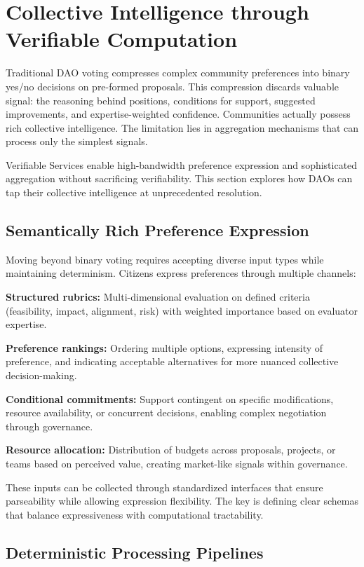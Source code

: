 \section{Collective Intelligence through Verifiable Computation}

Traditional DAO voting compresses complex community preferences into binary yes/no decisions on pre-formed proposals. This compression discards valuable signal: the reasoning behind positions, conditions for support, suggested improvements, and expertise-weighted confidence. Communities actually possess rich collective intelligence. The limitation lies in aggregation mechanisms that can process only the simplest signals.

Verifiable Services enable high-bandwidth preference expression and sophisticated aggregation without sacrificing verifiability. This section explores how DAOs can tap their collective intelligence at unprecedented resolution.

\subsection{Semantically Rich Preference Expression}

Moving beyond binary voting requires accepting diverse input types while maintaining determinism. Citizens express preferences through multiple channels:

\textbf{Structured rubrics:} Multi-dimensional evaluation on defined criteria (feasibility, impact, alignment, risk) with weighted importance based on evaluator expertise.

\textbf{Preference rankings:} Ordering multiple options, expressing intensity of preference, and indicating acceptable alternatives for more nuanced collective decision-making.

\textbf{Conditional commitments:} Support contingent on specific modifications, resource availability, or concurrent decisions, enabling complex negotiation through governance.

\textbf{Resource allocation:} Distribution of budgets across proposals, projects, or teams based on perceived value, creating market-like signals within governance.

These inputs can be collected through standardized interfaces that ensure parseability while allowing expression flexibility. The key is defining clear schemas that balance expressiveness with computational tractability.

\subsection{Deterministic Processing Pipelines}

